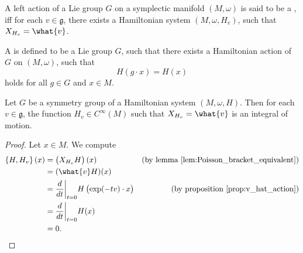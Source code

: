 \begin{definition}
	A left action of a Lie group $G$ on a symplectic manifold $(M,\omega)$ is said to be a , iff for each $v \in \mathfrak{g}$, there exists a Hamiltonian system $(M,\omega,H_v)$, such that $X_{H_v} = \what{v}$. 	
\end{definition}

\begin{definition}
	A  is defined to be a Lie group $G$, such that there exists a Hamiltonian action of $G$ on $(M,\omega)$, such that
	\begin{equation*}
		H(g \cdot x) = H(x)
	\end{equation*}
	\noindent holds for all $g \in G$ and $x \in M$.
\end{definition}

\begin{theorem}
	\label{thm:Noether_theorem}
	Let $G$ be a symmetry group of a Hamiltonian system $(M,\omega,H)$. Then for each $v \in \mathfrak{g}$, the function $H_v \in C^\infty(M)$ such that $X_{H_v} = \what{v}$ is an integral of motion.
\end{theorem}

\begin{proof}
	Let $x \in M$. We compute
	\begin{align*}
		\cbr[0]{H,H_v}(x) &= \del[1]{X_{H_v}H}(x) & (\text{by lemma } \ref{lem:Poisson_bracket_equivalent})\\
		&= (\what{v}H)(x)\\
		&= \frac{d}{dt}\bigg\vert_{t = 0}H\del[1]{\exp(-tv) \cdot x} & (\text{by proposition } \ref{prop:v_hat_action})\\
		&= \frac{d}{dt}\bigg\vert_{t = 0}H(x)\\
		&= 0.
	\end{align*}
\end{proof}

